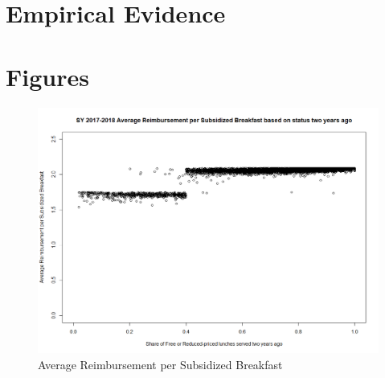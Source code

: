 \documentclass[12pt]{article}
\begin{document}
\section{Empirical Evidence}

\section{Figures}


\begin{figure}[h]
	\centering
	\includegraphics[width = \linewidth, keepaspectratio]{"4_9_2024_reimbursement_per_sub_plot.png"}
	\caption{Average Reimbursement per Subsidized Breakfast}
	\label{fig:your_label}
\end{figure}
\end{document}

